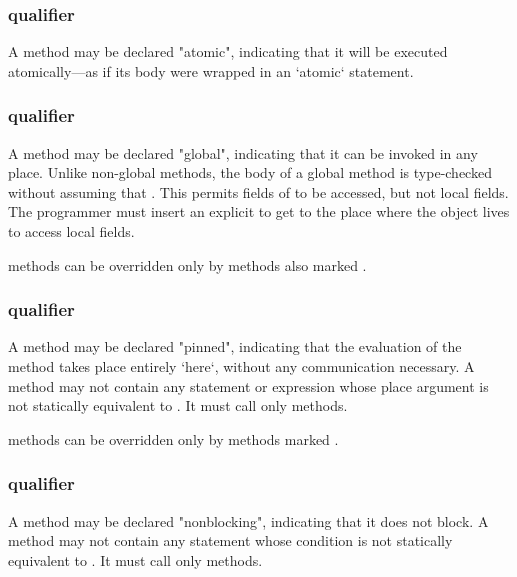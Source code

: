 \subsubsection{ qualifier}
\label{AtomicAnnotation}

A method may be declared \xcd"atomic", indicating that it will be executed
atomically---as if its body were wrapped in an \xcd`atomic` statement.

\subsubsection{ qualifier}
\label{LocalAnnotation}
\label{GlobalMethod}

A method may be declared \xcd"global", indicating that it can be invoked in
any place. Unlike non-global methods, the body of a global method is
type-checked without assuming that 
. This permits  fields of  to be
accessed, but not local fields. The programmer must insert an explicit
 to get to the place where the object lives to access local fields.

 methods can be overridden only by methods also marked .


\subsubsection{ qualifier}
\label{PinnedAnnotation}
\label{PinnedMethod}

A method may be declared \xcd"pinned", indicating that the evaluation of the
method takes place entirely \xcd`here`, without any communication necessary.
A  method may not
contain any  statement or expression whose place argument
is not statically equivalent to . It must call only
 methods. 

 methods can be overridden only by methods marked .

\subsubsection{ qualifier}
\label{NonblockingAnnotation}
\label{NonblockingMethod}

A method may be declared \xcd"nonblocking", indicating that it does not block.  
A  method may not
contain any  statement whose condition
is not statically equivalent to . It must call only
 methods. 

